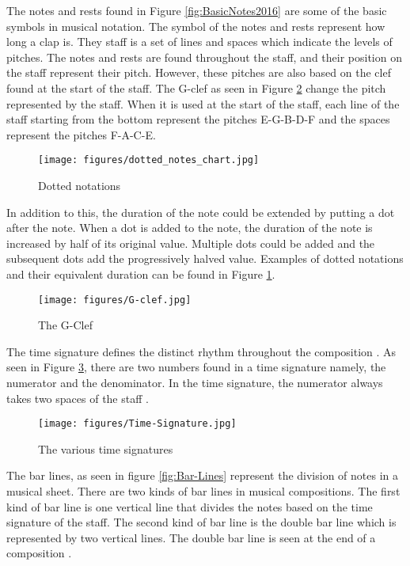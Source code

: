 The notes and rests found in Figure \ref{fig:BasicNotes2016} are some of the basic symbols in musical notation. The symbol of the notes and rests represent how long a clap is. They staff is a set of lines and spaces which indicate the levels of pitches. The notes and rests are found throughout the staff, and their position on the staff represent their pitch. However, these pitches are also based on the clef found at the start of the staff. The G-clef as seen in Figure \ref{fig:G-Clef} change the pitch represented by the staff. When it is used at the start of the staff, each line of the staff starting from the bottom represent the pitches E-G-B-D-F and the spaces represent the pitches F-A-C-E.

\begin{figure}[H]
    \centering
    \texttt{[image: figures/dotted\_notes\_chart.jpg]}
    \caption{Dotted notations \protect\cite{DottedNotes2015}}
    \label{fig:DottedNotes2015}
\end{figure}

In addition to this, the duration of the note could be extended by putting a dot after the note. When a dot is added to the note, the duration of the note is increased by half of its original value. Multiple dots could be added and the subsequent dots add the progressively halved value. Examples of dotted notations and their equivalent duration can be found in Figure \ref{fig:DottedNotes2015}.

\begin{figure}[H]
    \centering
    \texttt{[image: figures/G-clef.jpg]}
    \caption{The G-Clef \protect\cite{G-Clef}}
    \label{fig:G-Clef}
\end{figure}

The time signature defines the distinct rhythm throughout the composition \cite{rivadelo1986fundamentals}. As seen in Figure \ref{fig:Time-Signature}, there are two numbers found in a time signature namely, the numerator and the denominator. In the time signature, the numerator always takes two spaces of the staff \cite{read1964music, rivadelo1986fundamentals, burrows1999read}.

\begin{figure}[H]
    \centering
    \texttt{[image: figures/Time-Signature.jpg]}
    \caption{The various time signatures \protect\cite{Time-Signature}}
    \label{fig:Time-Signature}
\end{figure}

The bar lines, as seen in figure \ref{fig:Bar-Lines} represent the division of notes in a musical sheet. There are two kinds of bar lines in musical compositions. The first kind of bar line is one vertical line that divides the notes based on the time signature of the staff. The second kind of bar line is the double bar line which is represented by two vertical lines. The double bar line is seen at the end of a composition \cite{read1964music}.  

